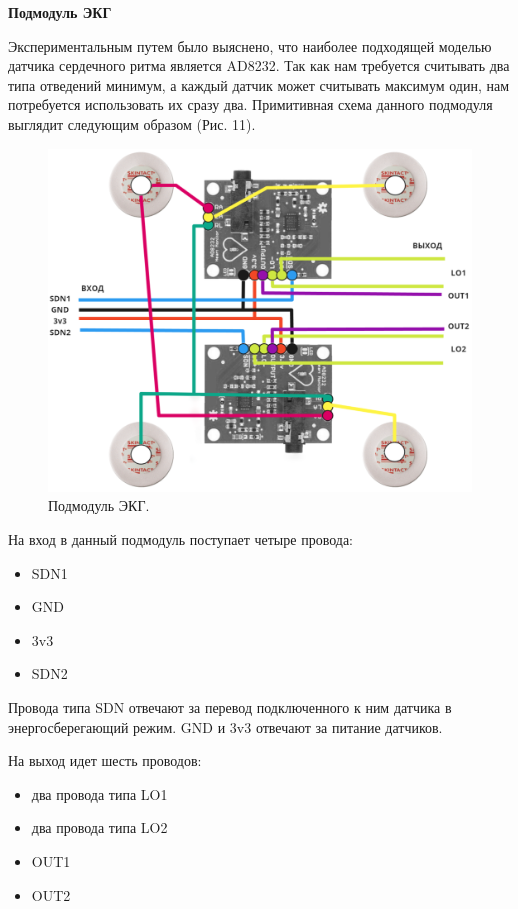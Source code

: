 \documentclass[12pt, russian]{extarticle}
\begin{document}
\begin{spacing}{1.5}
\par\textbf{Подмодуль ЭКГ}

Экспериментальным путем было выяснено, что наиболее подходящей моделью датчика сердечного ритма является AD8232. Так как нам требуется считывать два типа отведений минимум, а каждый датчик может считывать максимум один, нам потребуется использовать их сразу два. Примитивная схема данного подмодуля выглядит следующим образом (Рис. 11).

\begin{figure}[htbp]
\centering
\includegraphics[scale=0.5]{resources/sub1.png}
\caption{Подмодуль ЭКГ.}
\label{fig:my_label}
\end{figure}

На вход в данный подмодуль поступает четыре провода:

\begin{itemize}
    \item SDN1
    \item GND
    \item 3v3
    \item SDN2
\end{itemize}

Провода типа SDN отвечают за перевод подключенного к ним датчика в энергосберегающий режим. GND и 3v3 отвечают за питание датчиков.

На выход идет шесть проводов: 

\begin{itemize}
    \item два провода типа LO1
    \item два провода типа LO2
    \item OUT1
    \item OUT2
\end{itemize}


\end{spacing}
\end{document}
